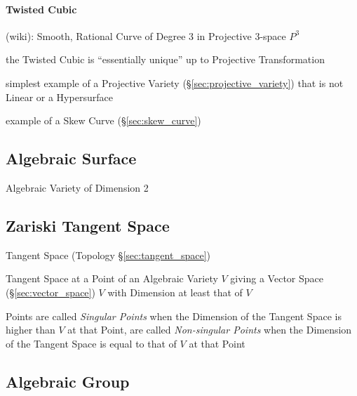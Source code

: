 \paragraph{Twisted Cubic}\label{sec:twisted_cubic}\hfill

(wiki): Smooth, Rational Curve of Degree $3$ in Projective $3$-space
$\xspace{P}^3$

the Twisted Cubic is ``essentially unique'' up to Projective Transformation

simplest example of a Projective Variety (\S\ref{sec:projective_variety}) that
is not Linear or a Hypersurface

example of a Skew Curve (\S\ref{sec:skew_curve})



\subsection{Algebraic Surface}\label{sec:algebraic_surface}

Algebraic Variety of Dimension 2



\subsection{Zariski Tangent Space}\label{sec:zariski_space}

Tangent Space (Topology \S\ref{sec:tangent_space})

Tangent Space at a Point of an Algebraic Variety $V$ giving a Vector Space
(\S\ref{sec:vector_space}) $V$ with Dimension at least that of $V$

Points are called \emph{Singular Points} when the Dimension of the Tangent
Space is higher than $V$ at that Point, are called \emph{Non-singular Points}
when the Dimension of the Tangent Space is equal to that of $V$ at that Point



\subsection{Algebraic Group}\label{sec:algebraic_group}

